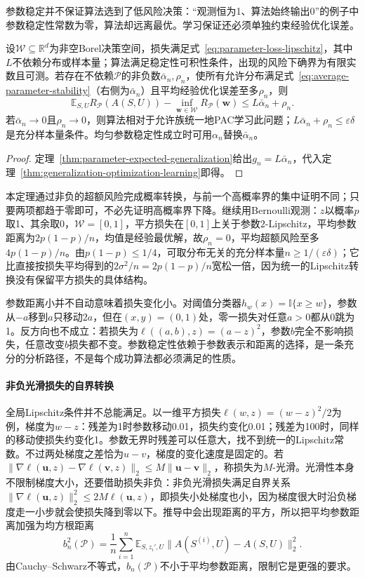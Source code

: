 参数稳定并不保证算法选到了低风险决策：“观测恒为1、算法始终输出0”的例子中参数稳定性常数为零，算法却远离最优。学习保证还必须单独约束经验优化误差。

\begin{theorem}[参数稳定性与可学习性]
\label{thm:parameter-stability-learning}
设$\mathcal W\subseteq\mathbb R^d$为非空Borel决策空间，损失满足式~\eqref{eq:parameter-loss-lipschitz}，其中$L$不依赖分布或样本量；算法满足稳定性可积性条件，出现的风险下确界为有限实数且可测。若存在不依赖$\mathcal P$的非负数$\bar\alpha_n,\rho_n$，使所有允许分布满足式~\eqref{eq:average-parameter-stability}（右侧为$\bar\alpha_n$）且平均经验优化误差至多$\rho_n$，则
\[
 \mathbb E_{S,U}R_{\mathcal P}(A(S,U))-\inf_{\bm w\in\mathcal W}R_{\mathcal P}(\bm w)\leq L\bar\alpha_n+\rho_n.
\]
若$\bar\alpha_n\to0$且$\rho_n\to0$，则算法相对于允许族统一地PAC学习此问题；$L\bar\alpha_n+\rho_n\leq\varepsilon\delta$是充分样本量条件。均匀参数稳定性成立时可用$\alpha_n$替换$\bar\alpha_n$。
\end{theorem}
\begin{proof}
定理~\ref{thm:parameter-expected-generalization}给出$g_n=L\bar\alpha_n$，代入定理~\ref{thm:generalization-optimization-learning}即得。
\end{proof}

本定理通过非负的超额风险完成概率转换，与前一个高概率界的集中证明不同；只要两项都趋于零即可，不必先证明高概率界下降。继续用Bernoulli观测：$z$以概率$p$取1、其余取0，$\mathcal W=[0,1]$，平方损失在$[0,1]$上关于参数$2$-Lipschitz，平均参数距离为$2p(1-p)/n$，均值是经验最优解，故$\rho_n=0$，平均超额风险至多$4p(1-p)/n$。由$p(1-p)\leq1/4$，可取分布无关的充分样本量$n\geq1/(\varepsilon\delta)$；它比直接按损失平均得到的$2\sigma^2/n=2p(1-p)/n$宽松一倍，因为统一的Lipschitz转换没有保留平方损失的具体结构。

参数距离小并不自动意味着损失变化小。对阈值分类器$h_w(x)=\mathbb I\{x\geq w\}$，参数从$-a$移到$a$只移动$2a$，但在$(x,y)=(0,1)$处，零一损失对任意$a>0$都从0跳为1。反方向也不成立：若损失为$\ell((a,b),z)=(a-z)^2$，参数$b$完全不影响损失，任意改变$b$损失都不变。参数稳定性依赖于参数表示和距离的选择，是一条充分的分析路径，不是每个成功算法都必须满足的性质。
\paragraph{非负光滑损失的自界转换}

全局Lipschitz条件并不总能满足。以一维平方损失$\ell(w,z)=(w-z)^2/2$为例，梯度为$w-z$：残差为1时参数移动0.01，损失约变化0.01；残差为100时，同样的移动使损失约变化1。参数无界时残差可以任意大，找不到统一的Lipschitz常数。不过两处梯度之差恰为$u-v$，梯度的变化速度是固定的。若$\|\nabla\ell(\bm u,z)-\nabla\ell(\bm v,z)\|_2\leq M\|\bm u-\bm v\|_2$，称损失为$M$-光滑。光滑性本身不限制梯度大小，还要借助损失非负：非负光滑损失满足自界关系$\|\nabla\ell(\bm u,z)\|_2^2\leq2M\ell(\bm u,z)$，即损失小处梯度也小，因为梯度很大时沿负梯度走一小步就会使损失降到零以下。推导中会出现距离的平方，所以把平均参数距离加强为均方根距离
\[
 b_n^2(\mathcal P)=\frac1n\sum_{i=1}^n\mathbb E_{S,z_i',U}\|A(S^{(i)},U)-A(S,U)\|_2^2.
\]
由Cauchy--Schwarz不等式，$b_n(\mathcal P)$不小于平均参数距离，限制它是更强的要求。

